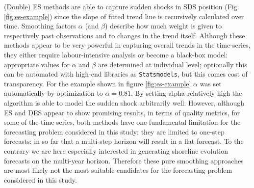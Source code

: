\documentclass[format=sigconf, review=false, screen=true]{acmart}
\begin{document}
(Double) ES methods are able to capture sudden shocks in SDS position (Fig. \ref{fig:es-example}) since the slope of fitted trend line is recursively calculated over time. Smoothing factors $\alpha$ (and $\beta$) describe how much weight is given to respectively past observations and to changes in the trend itself. Although these methods appear to be very powerful in capturing overall trends in the time-series, they either require labour-intensive analysis or become a black-box model: appropriate values for $\alpha$ and $\beta$ are determined at individual level; optionally this can be automated with high-end libraries as \texttt{Statsmodels}, but this comes cost of transparency.  For the example shown in figure \ref{fig:es-example} $\alpha$ was set automatically by optimization to $\alpha = 0.81$. By setting alpha relatively high the algorithm is able to model the sudden shock arbitrarily well. However, although ES and DES appear to show promising results, in terms of quality metrics, for some of the time series, both methods have one fundamental limitation for the forecasting problem considered in this study: they are limited to one-step forecasts; in so far that a multi-step horizon will result in a flat forecast. To the contrary we are here especially interested in generating shoreline evolution forecasts on the multi-year horizon. Therefore these pure smoothing approaches are most likely not the most suitable candidates for the forecasting problem considered in this study. 

\end{document}
